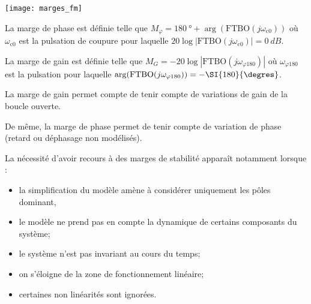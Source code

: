 \begin{marginfigure}
\texttt{[image: marges\_fm]}
\end{marginfigure}

\begin{defi}
La marge de phase est définie telle que $M_\varphi= \SI{180}{\degree} + \arg\left(\text{FTBO}(j\omega_{\text{c0}})\right)$ où $\omega_{\text{c0}}$ est la pulsation de coupure pour laquelle $20\log|\text{FTBO}\left(j\omega_{\text{c0}}\right)|=\SI{0}{dB}$.
\end{defi}

\begin{defi}
La marge de gain est définie telle que $M_G = -20\log|\text{FTBO} (j\omega_{\varphi 180})|$
où $\omega_{\varphi 180}$ est la pulsation pour laquelle $\arg(\text{FTBO}(j\omega_{ \varphi 180}))= -\SI{180}{\degres}$.
\end{defi}



 
La marge de gain permet compte de tenir compte de variations de gain de la boucle ouverte. 

De même, la marge de phase permet de tenir compte de variation de phase (retard ou déphasage non modélisés). 

La nécessité d'avoir recours à des marges de stabilité apparaît notamment lorsque : 
\begin{itemize}
\item la simplification du modèle amène à considérer uniquement les pôles dominant, 
\item le modèle ne prend pas en compte la dynamique de certains composants du système;
\item le système n'est pas invariant au cours du temps;
\item on s'éloigne de la zone de fonctionnement linéaire;
\item certaines non linéarités sont ignorées.
\end{itemize}


